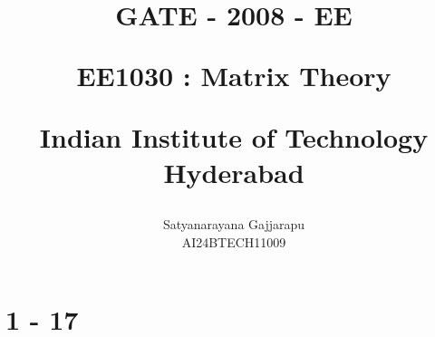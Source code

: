 \documentclass[journal]{IEEEtran}
\begin{document}

\vspace{3cm}




\title{
GATE - 2008 - EE

\large{EE1030 : Matrix Theory}

Indian Institute of Technology Hyderabad
}
\author{Satyanarayana Gajjarapu

AI24BTECH11009
}	





\maketitle




\bigskip

\renewcommand{\thefigure}{\theenumi}
\renewcommand{\thetable}{\theenumi}


\section{1 - 17}
\end{document}
